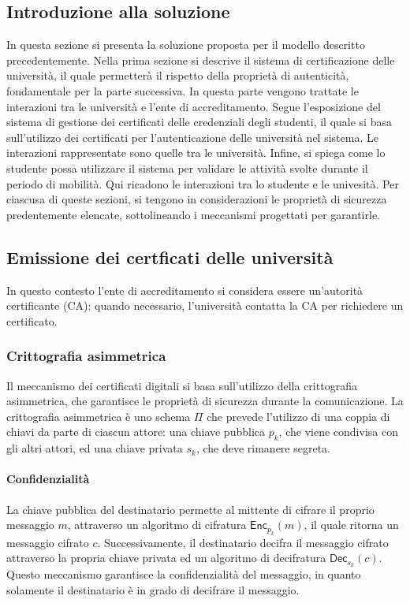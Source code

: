 \documentclass[a4paper,12pt]{article}
\begin{document}
\subsection{Introduzione alla soluzione}
In questa sezione si presenta la soluzione proposta per il modello descritto precedentemente.
\newline Nella prima sezione si descrive il sistema di certificazione delle università, il quale permetterà il rispetto della proprietà di autenticità, fondamentale per la parte successiva. In questa parte vengono trattate le interazioni tra le università e l'ente di accreditamento.  
\newline Segue l'esposizione del sistema di gestione dei certificati delle credenziali degli studenti, il quale si basa sull'utilizzo dei certificati per l'autenticazione delle università nel sistema. Le interazioni rappresentate sono quelle tra le università. 
\newline Infine, si spiega come lo studente possa utilizzare il sistema per validare le attività svolte durante il periodo di mobilità. Qui ricadono le interazioni tra lo studente e le univesità. 
\newline Per ciascusa di queste sezioni, si tengono in considerazioni le proprietà di sicurezza predentemente elencate, sottolineando i meccanismi progettati per garantirle. 
\subsection{Emissione dei certficati delle università} 
In questo contesto l'ente di accreditamento si considera essere un'autorità certificante (CA): quando necessario, l'università contatta la CA per richiedere un certificato. 
\subsubsection{Crittografia asimmetrica}
Il meccanismo dei certificati digitali si basa sull'utilizzo della crittografia asimmetrica, che garantisce le proprietà di sicurezza durante la comunicazione. 
\newline La crittografia asimmetrica è uno schema $\Pi$ che prevede l'utilizzo di una coppia di chiavi da parte di ciascun attore: una chiave pubblica $p_k$, che viene condivisa con gli altri attori, ed una chiave privata $s_k$, che deve rimanere segreta.
\paragraph{Confidenzialità} 
La chiave pubblica del destinatario permette al mittente di cifrare il proprio messaggio $m$, attraverso un algoritmo di cifratura $\mathsf{Enc}_{p_k}(m)$, il quale ritorna un messaggio cifrato $c$. Successivamente, il destinatario decifra il messaggio cifrato attraverso la propria chiave privata ed un algoritmo di decifratura $\mathsf{Dec}_{s_k}(c)$.
Questo meccanismo garantisce la confidenzialità del messaggio, in quanto solamente il destinatario è in grado di decifrare il messaggio.
\end{document}

